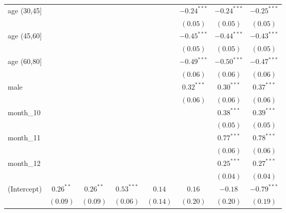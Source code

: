 \begin{table}
\begin{center}
\begin{tabular}{l c c c c c c c}
age (30,45]    &              &              &              &              & $-0.24^{***}$ & $-0.24^{***}$ & $-0.25^{***}$ \\
               &              &              &              &              & $(0.05)$      & $(0.05)$      & $(0.05)$      \\
age (45,60]    &              &              &              &              & $-0.45^{***}$ & $-0.44^{***}$ & $-0.43^{***}$ \\
               &              &              &              &              & $(0.05)$      & $(0.05)$      & $(0.05)$      \\
age (60,80]    &              &              &              &              & $-0.49^{***}$ & $-0.50^{***}$ & $-0.47^{***}$ \\
               &              &              &              &              & $(0.06)$      & $(0.06)$      & $(0.06)$      \\
male           &              &              &              &              & $0.32^{***}$  & $0.30^{***}$  & $0.37^{***}$  \\
               &              &              &              &              & $(0.06)$      & $(0.06)$      & $(0.06)$      \\
month\_10      &              &              &              &              &               & $0.38^{***}$  & $0.39^{***}$  \\
               &              &              &              &              &               & $(0.05)$      & $(0.05)$      \\
month\_11      &              &              &              &              &               & $0.77^{***}$  & $0.78^{***}$  \\
               &              &              &              &              &               & $(0.06)$      & $(0.06)$      \\
month\_12      &              &              &              &              &               & $0.25^{***}$  & $0.27^{***}$  \\
               &              &              &              &              &               & $(0.04)$      & $(0.04)$      \\
(Intercept)    & $0.26^{**}$  & $0.26^{**}$  & $0.53^{***}$ & $0.14$       & $0.16$        & $-0.18$       & $-0.79^{***}$ \\
               & $(0.09)$     & $(0.09)$     & $(0.06)$     & $(0.14)$     & $(0.20)$      & $(0.20)$      & $(0.19)$      \\

\end{tabular}
\end{center}
\end{table}
